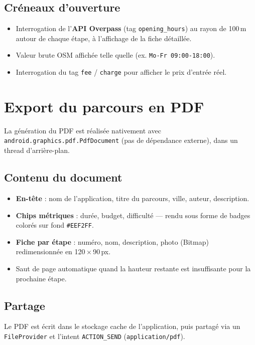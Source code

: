 \documentclass[a4paper,11pt]{article}
\begin{document}
\subsection{Créneaux d'ouverture}
\begin{itemize}[leftmargin=1.5em]
  \item Interrogation de l'\textbf{API Overpass} (tag \texttt{opening\_hours})
        au rayon de 100\,m autour de chaque étape, à l'affichage de la
        fiche détaillée.
  \item Valeur brute OSM affichée telle quelle (ex. \texttt{Mo-Fr 09:00-18:00}).
  \item Interrogation du tag \texttt{fee} / \texttt{charge} pour afficher
        le prix d'entrée réel.
\end{itemize}

\section{Export du parcours en PDF}

La génération du PDF est réalisée nativement avec \texttt{android.graphics.pdf.PdfDocument}
(pas de dépendance externe), dans un thread d'arrière-plan.

\subsection{Contenu du document}
\begin{itemize}[leftmargin=1.5em]
  \item \textbf{En-tête} : nom de l'application, titre du parcours, ville, auteur,
        description.
  \item \textbf{Chips métriques} : durée, budget, difficulté — rendu sous forme
        de badges colorés sur fond \texttt{\#EEF2FF}.
  \item \textbf{Fiche par étape} : numéro, nom, description, photo (Bitmap)
        redimensionnée en 120\,$\times$\,90\,px.
  \item Saut de page automatique quand la hauteur restante est insuffisante
        pour la prochaine étape.
\end{itemize}

\subsection{Partage}
Le PDF est écrit dans le stockage cache de l'application, puis partagé
via un \texttt{FileProvider} et l'intent \texttt{ACTION\_SEND}
(\texttt{application/pdf}).
\end{document}
